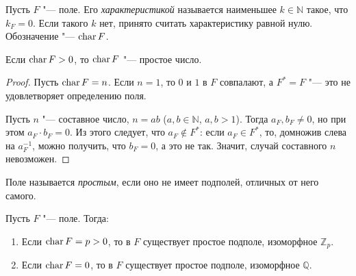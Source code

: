 \begin{definition}
	Пусть $F$ "--- поле. Его \textit{характеристикой} называется наименьшее $k \in \mathbb{N}$ такое, что $k_F = 0$. Если такого $k$ нет, принято считать характеристику равной нулю. Обозначение "--- $\operatorname{char}{F}$.
\end{definition}

\begin{proposition}
	Если $\operatorname{char}{F} > 0$, то $\operatorname{char}{F}$ "--- простое число.
\end{proposition}

\begin{proof}
	Пусть $\operatorname{char}{F} = n$. Если $n = 1$, то $0$ и $1$ в $F$ совпалают, а $F^* = F$ "--- это не удовлетворяет определению поля.
	
	Пусть $n$ "--- составное число, $n = ab$ ($a, b \in \mathbb{N}$, $a, b > 1$). Тогда $a_F, b_F \ne 0$, но при этом $a_F\cdot b_F = 0$. Из этого следует, что $a_F \not\in F^*$: если $a_F \in F^*$, то, домножив слева на $a_F^{-1}$, можно получить, что $b_F = 0$, а это не так. Значит, случай составного $n$ невозможен.
\end{proof}

\begin{definition}
	Поле называется \textit{простым}, если оно не имеет подполей, отличных от него самого.
\end{definition}

\begin{theorem}
	Пусть $F$ "--- поле. Тогда:
	\begin{enumerate}
		\item Если $\operatorname{char}{F} = p > 0$, то в $F$ существует простое подполе, изоморфное $\mathbb{Z}_p$.
		\item Если $\operatorname{char}{F} = 0$, то в $F$ существует простое подполе, изоморфное $\mathbb{Q}$.
	\end{enumerate}
\end{theorem}

